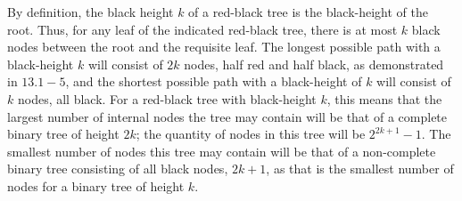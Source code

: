 By definition, the black height $ k $ of a red-black tree is the black-height of the root. Thus, for any leaf of the indicated red-black tree, there is at most $ k $ black nodes between the root and the requisite leaf. The longest possible path with a black-height $ k $ will consist of $ 2k $ nodes, half red and half black, as demonstrated in $ 13.1-5 $, and the shortest possible path with a black-height of $ k $ will consist of $ k $ nodes, all black. For a red-black tree with black-height $ k $, this means that the largest number of internal nodes the tree may contain will be that of a complete binary tree of height $ 2k $; the quantity of nodes in this tree will be $ 2^{2k+1} - 1 $. The smallest number of nodes this tree may contain will be that of a non-complete binary tree consisting of all black nodes, $ 2k + 1 $, as that is the smallest number of nodes for a binary tree of height $ k $.